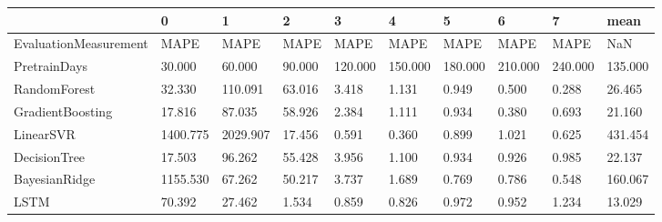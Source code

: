 \begin{tabular}{llllllllll}
\toprule
{} &        0 &        1 &      2 &       3 &       4 &       5 &       6 &       7 &    mean \\
\midrule
EvaluationMeasurement &     MAPE &     MAPE &   MAPE &    MAPE &    MAPE &    MAPE &    MAPE &    MAPE &     NaN \\
PretrainDays          &   30.000 &   60.000 & 90.000 & 120.000 & 150.000 & 180.000 & 210.000 & 240.000 & 135.000 \\
RandomForest          &   32.330 &  110.091 & 63.016 &   3.418 &   1.131 &   0.949 &   0.500 &   0.288 &  26.465 \\
GradientBoosting      &   17.816 &   87.035 & 58.926 &   2.384 &   1.111 &   0.934 &   0.380 &   0.693 &  21.160 \\
LinearSVR             & 1400.775 & 2029.907 & 17.456 &   0.591 &   0.360 &   0.899 &   1.021 &   0.625 & 431.454 \\
DecisionTree          &   17.503 &   96.262 & 55.428 &   3.956 &   1.100 &   0.934 &   0.926 &   0.985 &  22.137 \\
BayesianRidge         & 1155.530 &   67.262 & 50.217 &   3.737 &   1.689 &   0.769 &   0.786 &   0.548 & 160.067 \\
LSTM                  &   70.392 &   27.462 &  1.534 &   0.859 &   0.826 &   0.972 &   0.952 &   1.234 &  13.029 \\
\bottomrule
\end{tabular}
